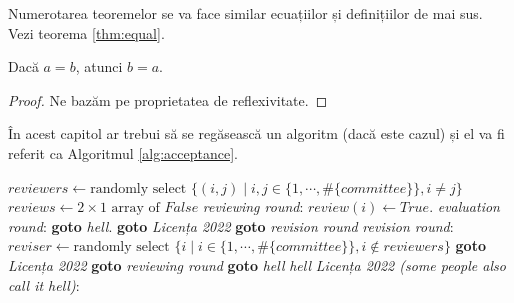 Numerotarea teoremelor se va face similar ecuațiilor și definițiilor de mai sus. Vezi teorema \ref{thm:equal}.

\begin{theorem}
    \label{thm:equal}
    Dacă $a=b$, atunci $b=a$.
\end{theorem}

\begin{proof}
Ne bazăm pe proprietatea de reflexivitate.
\end{proof}

\textcolor{gray}{\lipsum}

În acest capitol ar trebui să se regăsească un algoritm (dacă este cazul) și el va fi referit ca Algoritmul \ref{alg:acceptance}.

\begin{algorithm}[ht]
    \caption{Pseudo code for reviewing process}\label{alg:acceptance}
    \begin{algorithmic}[1]
            \State $\textit{reviewers} \gets \text{randomly select } \{(i,j) \mid i,j \in  \{1, \cdots, \#\{\textit{committee}\}\}, i \neq j \}$
            \State $\textit{reviews} \gets 2 \times 1 \text{ array of } \textit{False}$
            \BState \emph{reviewing round}:
                    \State $\textit{review}(i) \gets \textit{True}$.
                \Else {}
                \EndIf
            \EndFor
            \BState \emph{evaluation round}:
                \State \textbf{goto} \emph{hell}.
                \State \textbf{goto} \emph{Licența 2022}
            \Else \textbf{ goto} \emph{revision round}
            \EndIf
            \BState \emph{revision round}:
            \State $\textit{reviser} \gets \text{randomly select } \{i \mid i \in  \{1, \cdots, \#\{\textit{committee}\}\}, i \not\in \textit{reviewers} \}$
                \State \textbf{ goto} \emph{Licența 2022}
                \State \textbf{ goto} \emph{reviewing round}
            \Else \textbf{ goto} \emph{hell}
            \EndIf
            \BState \emph{hell} 
            \State {}
            \BState \emph{Licența 2022 (some people also call it hell)}:
            \State {}
        \EndProcedure
    \end{algorithmic}
\end{algorithm}

